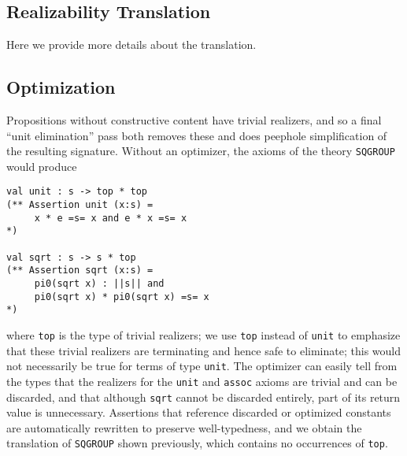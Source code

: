 \subsection{Realizability Translation}
Here we provide more details about the translation.

\subsection{Optimization}
Propositions without constructive content have trivial realizers, and
so a final ``unit elimination'' pass both removes these and does 
peephole simplification of the resulting signature.   Without an optimizer,
the axioms of the theory \Verb|SQGROUP| would produce
\begin{Verbatim}
val unit : s -> top * top
(** Assertion unit (x:s) =  
     x * e =s= x and e * x =s= x
*)

val sqrt : s -> s * top
(** Assertion sqrt (x:s) =  
     pi0(sqrt x) : ||s|| and 
     pi0(sqrt x) * pi0(sqrt x) =s= x
*)
\end{Verbatim}
where \Verb|top| is the type of trivial realizers; we use 
\Verb|top| instead of \Verb|unit| to emphasize that these trivial realizers are terminating and hence safe to eliminate; this would not necessarily
be true for terms of type \Verb|unit|.  The optimizer can
easily tell from the types that the realizers for the \Verb|unit| and
\Verb|assoc| axioms are trivial and can be discarded, and that
although \Verb|sqrt| cannot be discarded entirely, part of its return
value is unnecessary.  Assertions that reference discarded or optimized
constants are automatically rewritten to preserve well-typedness, and we obtain the translation of \Verb|SQGROUP| shown previously, which contains no
occurrences of \Verb|top|.


